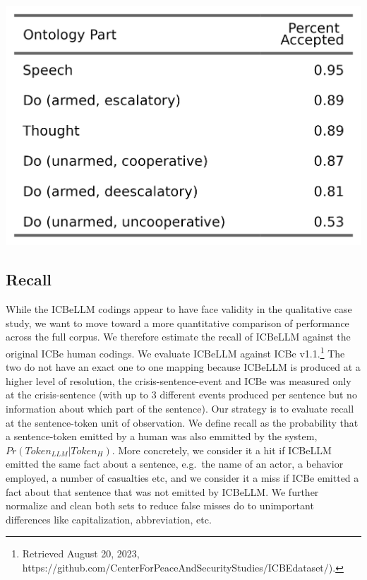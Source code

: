 \documentclass[
]{article}
\begin{document}
\begin{center}
\includegraphics{Table3.png}
\end{center}

\subsection{Recall}\label{recall}

While the ICBeLLM codings appear to have face validity in the
qualitative case study, we want to move toward a more quantitative
comparison of performance across the full corpus. We therefore estimate
the recall of ICBeLLM against the original ICBe human codings. We
evaluate ICBeLLM against ICBe v1.1.\footnote{Retrieved August 20, 2023,
  https://github.com/CenterForPeaceAndSecurityStudies/ICBEdataset/).}
The two do not have an exact one to one mapping because ICBeLLM is
produced at a higher level of resolution, the crisis-sentence-event and
ICBe was measured only at the crisis-sentence (with up to 3 different
events produced per sentence but no information about which part of the
sentence). Our strategy is to evaluate recall at the sentence-token unit
of observation. We define recall as the probability that a
sentence-token emitted by a human was also emmitted by the system,
\(Pr(Token_{LLM} | Token_{H})\). More concretely, we consider it a hit
if ICBeLLM emitted the same fact about a sentence, e.g.~the name of an
actor, a behavior employed, a number of casualties etc, and we consider
it a miss if ICBe emitted a fact about that sentence that was not
emitted by ICBeLLM. We further normalize and clean both sets to reduce
false misses do to unimportant differences like capitalization,
abbreviation, etc.
\end{document}

